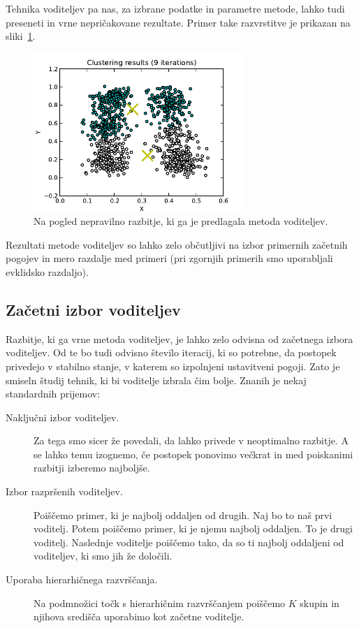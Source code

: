 Tehnika voditeljev pa nas, za izbrane podatke in parametre metode,
lahko tudi preseneti in vrne nepričakovane rezultate. Primer take
razvrstitve je prikazan na sliki~\ref{f-kmeans-stripes}.

\begin{figure}[htbp]
\begin{center}
\includegraphics[width=8cm]{slike/kmeans-stripes.pdf}
\caption{Na pogled nepravilno razbitje, ki ga je predlagala metoda voditeljev.}
\label{f-kmeans-stripes}
\end{center}
\end{figure}

Rezultati metode voditeljev so lahko zelo občutljivi na izbor
primernih začetnih pogojev in mero razdalje med primeri (pri zgornjih
primerih smo uporabljali evklidsko razdaljo).

\subsection{Začetni izbor voditeljev}

Razbitje, ki ga vrne metoda voditeljev, je lahko zelo odvisna od
začetnega izbora voditeljev. Od te bo tudi odvisno število iteracij,
ki so potrebne, da postopek privedejo v stabilno stanje, v katerem so
izpolnjeni ustavitveni pogoji. Zato je smiseln študij tehnik, ki bi
voditelje izbrala čim bolje. Znanih je nekaj standardnih prijemov:

\begin{description}
\item[Naključni izbor voditeljev.] Za tega smo sicer že povedali, da
  lahko privede v neoptimalno razbitje. A se lahko temu izognemo, če
  postopek ponovimo večkrat in med poiskanimi razbitji izberemo
  najboljše. 
\item[Izbor razpršenih voditeljev.] Poiščemo primer, ki je najbolj
  oddaljen od drugih. Naj bo to naš prvi voditelj. Potem poiščemo
  primer, ki je njemu najbolj oddaljen. To je drugi
  voditelj. Naslednje voditelje poiščemo tako, da so ti najbolj
  oddaljeni od voditeljev, ki smo jih že določili.
\item[Uporaba hierarhičnega razvrščanja.] Na podmnožici točk s
  hierarhičnim razvrščanjem poiščemo $K$ skupin in njihova
  središča uporabimo kot začetne voditelje. 
\end{description}

